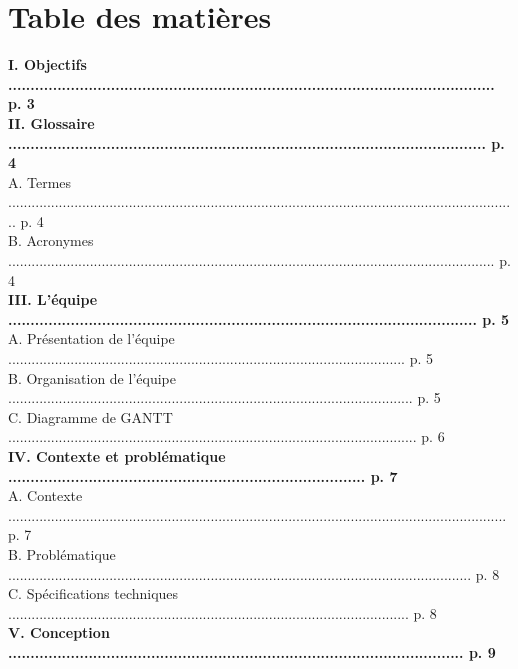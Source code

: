 \documentclass[a4paper,11pt]{book}
\begin{document}
	
	
	\maketitle
\section*{Table des matières}
\begin{tabbing}
\textbf{{I. Objectifs ............................................................................................................. p. 3}}\\
\textbf{{II. Glossaire ........................................................................................................... p. 4}}\\
A. Termes ................................................................................................................................... p. 4\\
B. Acronymes ............................................................................................................................. p. 4\\
\textbf{{III. L'équipe ......................................................................................................... p. 5}}\\
A. Présentation de l'équipe ...................................................................................................... p. 5\\
B. Organisation de l'équipe ........................................................................................................ p. 5\\
C. Diagramme de GANTT ......................................................................................................... p. 6\\
\textbf{{IV. Contexte et problématique ................................................................................ p. 7}} \\
A. Contexte ................................................................................................................................ p. 7\\
B. Problématique ....................................................................................................................... p. 8\\
C. Spécifications techniques ....................................................................................................... p. 8\\
\textbf{{V. Conception ...................................................................................................... p. 9}}\\

\end{tabbing}
\end{document}
